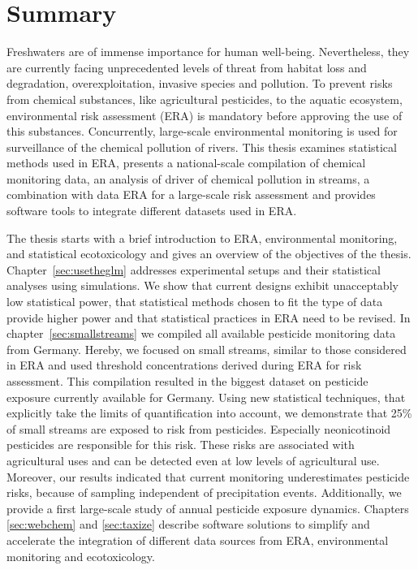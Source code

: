 



\thispagestyle{empty}
\begingroup
\let\clearpage\relax
\let\cleardoublepage\relax
\let\cleardoublepage\relax
\chapter*{Summary}
\thispagestyle{empty}

Freshwaters are of immense importance for human well-being.
Nevertheless, they are currently facing unprecedented levels of threat from habitat loss and degradation, overexploitation, invasive species and
pollution. To prevent risks from chemical substances, like agricultural pesticides, to the aquatic ecosystem, environmental risk assessment (ERA) is mandatory before approving the use of this substances. Concurrently, large-scale environmental monitoring is used for surveillance of the chemical pollution of rivers. 
This thesis examines statistical methods used in ERA, presents a national-scale compilation of chemical monitoring data, an analysis of driver of chemical pollution in streams, a combination with data ERA for a large-scale risk assessment and provides software tools to integrate different datasets used in ERA.

The thesis starts with a brief introduction to ERA, environmental monitoring, and statistical ecotoxicology and gives an overview of the objectives of the thesis.
Chapter~\ref{sec:usetheglm} addresses experimental setups and their statistical analyses using simulations. We show that current designs exhibit unacceptably low statistical power, that statistical methods chosen to fit the type of data provide higher power and that statistical practices in ERA need to be revised.
In chapter~\ref{sec:smallstreams} we compiled all available pesticide monitoring data from Germany.
Hereby, we focused on small streams, similar to those considered in ERA and used threshold concentrations derived during ERA for risk assessment. 
This compilation resulted in the biggest dataset on pesticide exposure currently available for Germany.
Using new statistical techniques, that explicitly take the limits of quantification into account, we demonstrate that 25\% of small streams are exposed to risk from pesticides. 
Especially neonicotinoid pesticides are responsible for this risk.
These risks are associated with agricultural uses and can be detected even at low levels of agricultural use. Moreover, our results indicated that current monitoring underestimates pesticide risks, because of sampling independent of precipitation events.
Additionally, we provide a first large-scale study of annual pesticide exposure dynamics.
Chapters \ref{sec:webchem} and \ref{sec:taxize} describe software solutions to simplify and accelerate the integration of different data sources 
from ERA, environmental monitoring and ecotoxicology.


